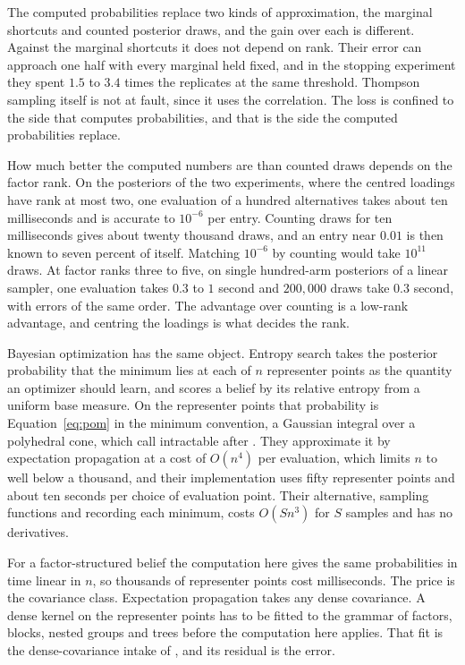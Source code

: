 \documentclass[11pt]{article}
\begin{document}
The computed probabilities replace two kinds of approximation, the marginal
shortcuts and counted posterior draws, and the gain over each is
different. Against the marginal shortcuts it does not depend on
rank. Their error can approach one half with every marginal held
fixed, and in the stopping experiment they spent $1.5$ to $3.4$ times
the replicates at the same threshold. Thompson sampling itself is not
at fault, since it uses the correlation. The loss is confined to the
side that computes probabilities, and that is the side the computed probabilities replace.

How much better the computed numbers are than counted draws depends
on the factor rank. On the posteriors of the two experiments, where
the centred loadings have rank at most two, one evaluation of a
hundred alternatives takes about ten milliseconds and is accurate to
$10^{-6}$ per entry. Counting draws for ten milliseconds gives about
twenty thousand draws, and an entry near $0.01$ is then known to
seven percent of itself. Matching $10^{-6}$ by counting would take
$10^{11}$ draws. At factor ranks three to five, on single
hundred-arm posteriors of a linear sampler, one evaluation takes
$0.3$ to $1$ second and $200{,}000$ draws take $0.3$ second, with
errors of the same order. The advantage over counting is a low-rank
advantage, and centring the loadings is what decides the rank.

Bayesian optimization has the same object. Entropy search
\citep{hennig2012} takes the posterior probability that the minimum
lies at each of $n$ representer points as the quantity an optimizer
should learn, and scores a belief by its relative entropy from a
uniform base measure. On the representer points that probability is
Equation~\eqref{eq:pom} in the minimum convention, a Gaussian
integral over a polyhedral cone, which \citet{hennig2012} call
intractable after \citet{plackett1954}. They approximate it by
expectation propagation at a cost of $O(n^4)$ per evaluation, which
limits $n$ to well below a thousand, and their implementation uses
fifty representer points and about ten seconds per choice of
evaluation point. Their alternative, sampling functions and recording
each minimum, costs $O(S n^3)$ for $S$ samples and has no
derivatives.

For a factor-structured belief the computation here gives the same probabilities in time linear in $n$, so thousands of representer points cost
milliseconds. The price is the covariance class. Expectation propagation takes any
dense covariance. A dense kernel on the representer points has to be
fitted to the grammar of factors, blocks, nested groups and trees
before the computation here applies. That fit is the dense-covariance
intake of \citet{cotton2026}, and its residual is the error.
\end{document}
